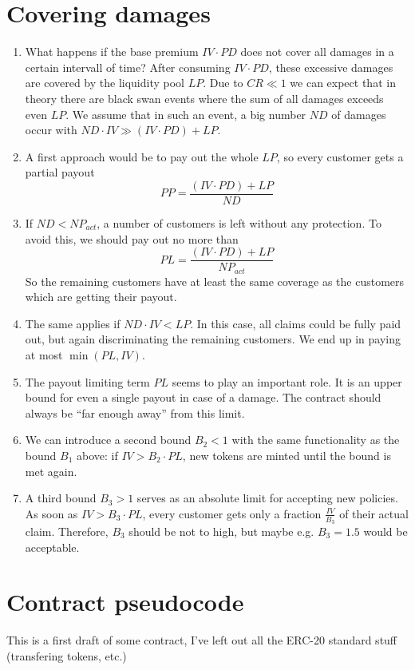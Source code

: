 \documentclass[runningheads,a4paper]{llncs}
\begin{document}
\section{Covering damages}
\begin{enumerate}
\item What happens if the base premium $IV \cdot PD$ does not cover all damages in a certain intervall of time?
After consuming $IV \cdot PD$, these excessive damages are covered by the liquidity pool $LP$.
Due to $CR \ll 1$ we can expect that in theory there are black swan events where the sum of all damages 
exceeds even $LP$. We assume that in such an event, a big number $ND$ of damages occur with 
$ND \cdot IV \gg (IV \cdot PD) + LP$. 
\item A first approach would be to pay out the whole $LP$, 
so every customer gets a partial payout
\begin{equation} \label{eq:dam1}
    PP = \frac{(IV \cdot PD) + LP}{ND}
\end{equation}
\item If $ND < NP_{act}$, a number of customers is left without any protection.
To avoid this, we should pay out no more than
\begin{equation} \label{eq:dam2}
    PL = \frac{(IV \cdot PD) + LP}{NP_{act}}
\end{equation} 
So the remaining customers have at least the same coverage as the customers which are getting their payout.
\item The same applies if $ND \cdot IV < LP$. In this case, all claims could be fully paid out, but again discriminating
the remaining customers. We end up in paying at most $\min(PL, IV)$. 
\item The payout limiting term $PL$ seems to play an important role. 
It is an upper bound for even a single payout in case of a damage. 
The contract should always be ``far enough away'' from this limit. 
\item We can introduce a second bound $B_2 < 1$ with the same functionality as the bound $B_1$ above:
if $IV > B_2 \cdot PL$, new tokens are minted until the bound is met again.
\item A third bound $B_3 > 1 $ serves as an absolute limit for accepting new policies. As soon as $IV > B_3 \cdot PL$, every customer gets only a fraction $\frac{IV}{B_3}$ of their actual claim. Therefore, $B_3$ should be not to high, but maybe e.g. $B_3 = 1.5$ would be acceptable.

\end{enumerate}

\section{Contract pseudocode}
This is a first draft of some contract, I've left out all the ERC-20 standard stuff (transfering tokens, etc.)



\nocite{*} 
\end{document}
